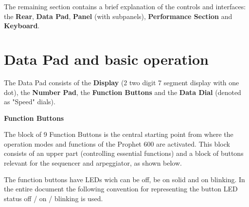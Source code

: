 \documentclass[landscape, 11pt, oneside]{report}
\newenvironment{flowtext}{\addmargin[0cm]{7cm}}{\endaddmargin} %
\begin{document}
\begin{flowtext}
{
}

The remaining section contains a brief explanation of the controls and interfaces: the \textbf{Rear}, \textbf{Data Pad}, \textbf{Panel} (with subpanels), \textbf{Performance Section} and \textbf{Keyboard}.

\section{Data Pad and basic operation}\label{datapad}

The Data Pad consists of the \textbf{Display} (2 two digit 7 segment display with one dot), the \textbf{Number Pad}, the \textbf{Function Buttons} and the \textbf{Data Dial} (denoted as "Speed" dials). 

\textbf{Function Buttons}

The block of 9 Function Buttons is the central starting point from where the operation modes and functions of the Prophet 600 are activated. This block consists of an upper part (controlling essential functions) and a block of buttons relevant for the sequencer and arpeggiator, as shown below.


The function buttons have LEDs wich can be off, be on solid and on blinking. In the entire document the following convention for representing the button LED status off / on / blinking is used.


\end{flowtext}
\end{document}
